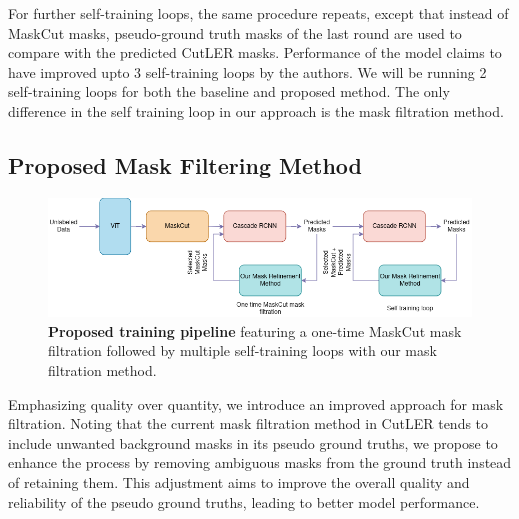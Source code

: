 For further self-training loops, the same procedure repeats, except that instead of MaskCut masks, pseudo-ground truth masks of the last round are used to compare with the predicted CutLER masks. Performance of the model claims to have improved upto 3 self-training loops by the authors. We will be running 2 self-training loops for both the baseline and proposed method. The only difference in the self training loop in our approach is the mask filtration method.

\subsection{Proposed Mask Filtering Method}
\label{section:proposed_method}

\begin{figure}
	\centering
	\includegraphics[width=1\textwidth]{Images/main/proposed_method.png}
	\caption[\textbf{Proposed training pipeline}]{\textbf{Proposed training pipeline} featuring a one-time MaskCut mask filtration followed by multiple self-training loops with our mask filtration method.}
	\label{fig:proposed_training}
\end{figure}
Emphasizing quality over quantity, we introduce an improved approach for mask filtration. Noting that the current mask filtration method in CutLER tends to include unwanted background masks in its pseudo ground truths, we propose to enhance the process by removing ambiguous masks from the ground truth instead of retaining them. This adjustment aims to improve the overall quality and reliability of the pseudo ground truths, leading to better model performance.

